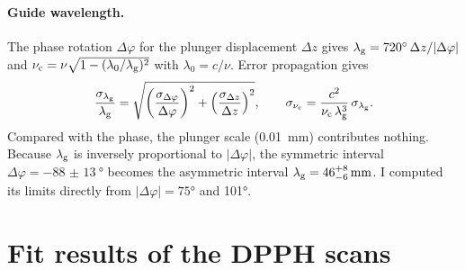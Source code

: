 \paragraph{Guide wavelength.}
The phase rotation $\Delta\varphi$ for the plunger displacement $\Delta z$ gives $\lambda_\mathrm{g}=\ang{720}\,\Delta z/|\Delta\varphi|$
and $\nu_\mathrm c=\nu\sqrt{1-(\lambda_0/\lambda_\mathrm{g})^2}$ with $\lambda_0=c/\nu$. Error propagation gives
\begin{equation}
  \frac{\sigma_{\lambda_\mathrm{g}}}{\lambda_\mathrm{g}}=\sqrt{\left(\frac{\sigma_{\Delta\varphi}}{\Delta\varphi}\right)^2
  +\left(\frac{\sigma_{\Delta z}}{\Delta z}\right)^2},\qquad
  \sigma_{\nu_\mathrm c}=\frac{c^2}{\nu_\mathrm c\,\lambda_\mathrm{g}^3}\,\sigma_{\lambda_\mathrm{g}} .
\end{equation}
Compared with the phase, the plunger scale (\qty{0.01}{mm}) contributes nothing. Because $\lambda_\mathrm{g}$ is inversely
proportional to $|\Delta\varphi|$, the symmetric interval $\Delta\varphi=\qty{-88(13)}{\degree}$ becomes the asymmetric
interval $\lamg=46^{+8}_{-6}\,\unit{mm}$. I computed its limits directly from $|\Delta\varphi|=\ang{75}$ and \ang{101}.

\section{Fit results of the DPPH scans}\label{app:fits}


